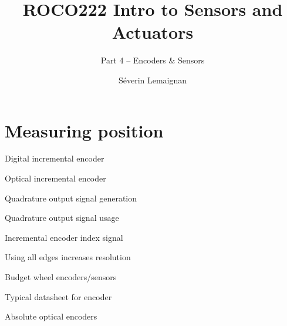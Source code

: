 \documentclass[compress]{beamer}
\title{ROCO222 \newline Intro to Sensors and Actuators}
\subtitle{Part 4 -- Encoders \& Sensors}
\date{}
\author{Séverin Lemaignan}
\institute{Centre for Neural Systems and Robotics\\{\bf Plymouth University}}
\begin{document}

\maketitle

\section{Measuring position}

{
    \begin{frame}{Digital incremental encoder}
    \end{frame}
}
{
    \begin{frame}{Optical incremental encoder}
    \end{frame}
}

{
    \begin{frame}{Quadrature output signal generation}
    \end{frame}
}

{
    \begin{frame}{Quadrature output signal usage}
    \end{frame}
}

{
    \begin{frame}{Incremental encoder index signal}
    \end{frame}
}

{
    \begin{frame}{Using all edges increases resolution}
    \end{frame}
}

{
    \begin{frame}{Budget wheel encoders/sensors}
    \end{frame}
}

{
    \begin{frame}{Typical datasheet for encoder}
    \end{frame}
}

{
    \begin{frame}{Absolute optical encoders}
    \end{frame}
}
\end{document}
